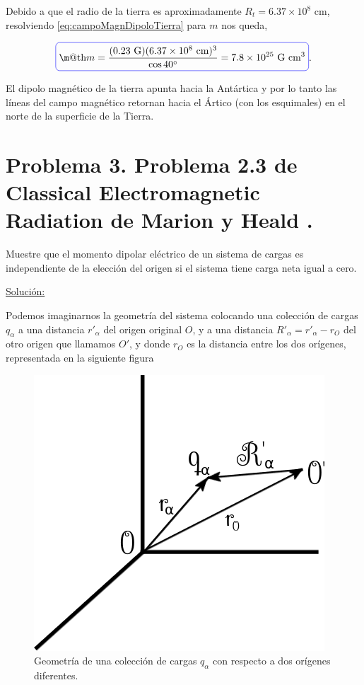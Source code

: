 \documentclass[a4paper,11pt]{article}
\makeatletter
\numberwithin{equation}{section}
\newcommand*{\boxcolor}{blue}
\renewcommand{\boxed}[1]{\textcolor{\boxcolor}{%
\tikz[baseline={([yshift=-1ex]current bounding box.center)}] \node [rectangle, minimum width=1ex,rounded corners,draw] {\normalcolor\m@th$\displaystyle#1$};}}
\makeatother
\begin{document}
Debido a que el radio de la tierra es aproximadamente $R_t = 6.37 \times 10^8$ cm, 
resolviendo \eqref{eq:campoMagnDipoloTierra} para $m$ nos queda, 

\begin{equation}
 \boxed{m = \frac{(0.23 \text{ G})(6.37 \times 10^8 \text{ cm})^3}{\cos{40^\circ}} = 
 7.8 \times 10^{25} \text{ G}\text{ cm}^3}.
\end{equation}

El dipolo magnético de la tierra apunta hacia la Antártica y por lo tanto las líneas 
del campo magnético retornan hacia el Ártico (con los esquimales) en el norte de la 
superficie de la Tierra.

\newpage

\section{Problema 3. Problema 2.3 de Classical Electromagnetic Radiation
de Marion y Heald \cite{marion2}.}

Muestre que el momento dipolar eléctrico de un sistema de cargas es independiente 
de la elección del origen si el sistema tiene carga neta igual a cero.

\vspace{.3cm}

\underline{Solución:} \vspace{.3cm}

Podemos imaginarnos la geometría del sistema colocando una colección de cargas 
$q_\alpha$ a una distancia $r'_\alpha$ del origen original $O$, y a una distancia 
$R'_\alpha = r'_\alpha - r_O$ del otro origen que llamamos $O'$, y donde $r_O$ es 
la distancia entre los dos orígenes, representada en la siguiente figura 

\begin{figure}[H]
 \center 
 \includegraphics[scale=0.5]{problema3fig1}
 \caption{Geometría de una colección de cargas $q_\alpha$ con respecto a dos 
 orígenes diferentes.}
 \label{fig:problema3fig1}
\end{figure}
\end{document}
